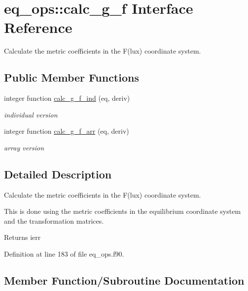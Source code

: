 \hypertarget{interfaceeq__ops_1_1calc__g__f}{}\section{eq\+\_\+ops\+:\+:calc\+\_\+g\+\_\+f Interface Reference}
\label{interfaceeq__ops_1_1calc__g__f}


Calculate the metric coefficients in the F(lux) coordinate system.  


\subsection*{Public Member Functions}
\begin{DoxyCompactItemize}
\item 
integer function \hyperlink{interfaceeq__ops_1_1calc__g__f_a2c6ba8f85bc6ab16e69d4ec2ccaa317a}{calc\+\_\+g\+\_\+f\+\_\+ind} (eq, deriv)
\begin{DoxyCompactList}\small\item\em individual version \end{DoxyCompactList}\item 
integer function \hyperlink{interfaceeq__ops_1_1calc__g__f_a3f5964da7860a9f52e9aa843acd727ad}{calc\+\_\+g\+\_\+f\+\_\+arr} (eq, deriv)
\begin{DoxyCompactList}\small\item\em array version \end{DoxyCompactList}\end{DoxyCompactItemize}


\subsection{Detailed Description}
Calculate the metric coefficients in the F(lux) coordinate system. 

This is done using the metric coefficients in the equilibrium coordinate system and the transformation matrices.

\begin{DoxyReturn}{Returns}
ierr 
\end{DoxyReturn}


Definition at line 183 of file eq\+\_\+ops.\+f90.



\subsection{Member Function/\+Subroutine Documentation}
\mbox{\label{interfaceeq__ops_1_1calc__g__f_a3f5964da7860a9f52e9aa843acd727ad}} 
